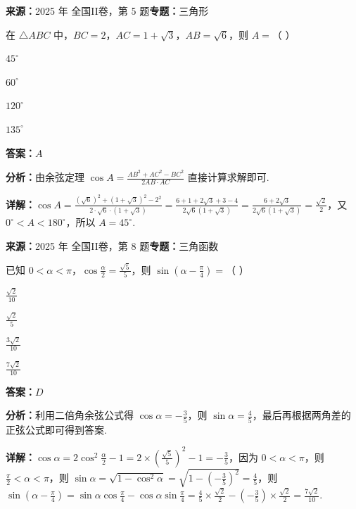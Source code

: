 \begin{question}[points=5]
\textbf{来源：}2025 年 全国II卷，第 5 题\quad \textbf{专题：}三角形\par
在 $\triangle ABC$ 中，$BC=2$，$AC=1+\sqrt{3}$，$AB=\sqrt{6}$，则 $A=$（ ）
\begin{choices}
  \item $45^\circ$
  \item $60^\circ$
  \item $120^\circ$
  \item $135^\circ$
\end{choices}
\begin{solution}
\textbf{答案：}$A$

\textbf{分析：}由余弦定理 $\cos A=\frac{AB^2+AC^2-BC^2}{2AB\cdot AC}$ 直接计算求解即可.

\textbf{详解：}$\cos A=\frac{(\sqrt{6})^2+(1+\sqrt{3})^2-2^2}{2\cdot\sqrt{6}\cdot(1+\sqrt{3})}=\frac{6+1+2\sqrt{3}+3-4}{2\sqrt{6}(1+\sqrt{3})}=\frac{6+2\sqrt{3}}{2\sqrt{6}(1+\sqrt{3})}=\frac{\sqrt{2}}{2}$，又 $0^\circ<A<180^\circ$，所以 $A=45^\circ$.
\end{solution}
\end{question}

\begin{question}[points=5]
\textbf{来源：}2025 年 全国II卷，第 8 题\quad \textbf{专题：}三角函数\par
已知 $0<\alpha<\pi$，$\cos\frac{\alpha}{2}=\frac{\sqrt{5}}{5}$，则 $\sin\left(\alpha-\frac{\pi}{4}\right)=$（ ）
\begin{choices}
  \item $\frac{\sqrt{2}}{10}$
  \item $\frac{\sqrt{2}}{5}$
  \item $\frac{3\sqrt{2}}{10}$
  \item $\frac{7\sqrt{2}}{10}$
\end{choices}
\begin{solution}
\textbf{答案：}$D$

\textbf{分析：}利用二倍角余弦公式得 $\cos\alpha=-\frac{3}{5}$，则 $\sin\alpha=\frac{4}{5}$，最后再根据两角差的正弦公式即可得到答案.

\textbf{详解：}$\cos\alpha=2\cos^2\frac{\alpha}{2}-1=2\times\left(\frac{\sqrt{5}}{5}\right)^2-1=-\frac{3}{5}$，因为 $0<\alpha<\pi$，则 $\frac{\pi}{2}<\alpha<\pi$，则 $\sin\alpha=\sqrt{1-\cos^2\alpha}=\sqrt{1-\left(-\frac{3}{5}\right)^2}=\frac{4}{5}$，则 $\sin\left(\alpha-\frac{\pi}{4}\right)=\sin\alpha\cos\frac{\pi}{4}-\cos\alpha\sin\frac{\pi}{4}=\frac{4}{5}\times\frac{\sqrt{2}}{2}-\left(-\frac{3}{5}\right)\times\frac{\sqrt{2}}{2}=\frac{7\sqrt{2}}{10}$.
\end{solution}
\end{question}

